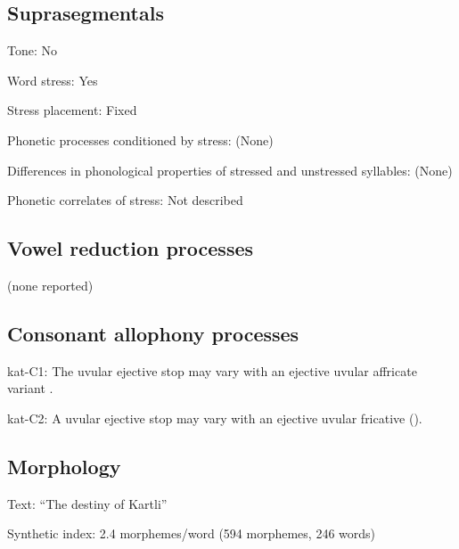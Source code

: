 {\subsection*{Suprasegmentals}
\begin{appendixdesc}
\item[Tone:] No

\item[Word stress:] Yes

\item[Stress placement:] Fixed

\item[Phonetic processes conditioned by stress:] (None)

\item[Differences in phonological properties of stressed and unstressed syllables:] (None)

\item[Phonetic correlates of stress:] Not described
\end{appendixdesc}
\subsection*{Vowel reduction processes}

(none reported)
\subsection*{Consonant allophony processes}
\begin{appendixdesc}

\item[kat-C1:] The uvular ejective stop may vary with an ejective uvular affricate variant \citep{Aronson1991}.

\item[kat-C2:] A uvular ejective stop may vary with an ejective uvular fricative (\citealt{ShostedChikovani2006}).
\end{appendixdesc}
\subsection*{Morphology}

\begin{appendixdesc}

\item[Text:] “The destiny of Kartli” \citep[655--663]{Hewitt1995}

\item[Synthetic index:] 2.4 morphemes/word (594 morphemes, 246 words)
\end{appendixdesc}
}
